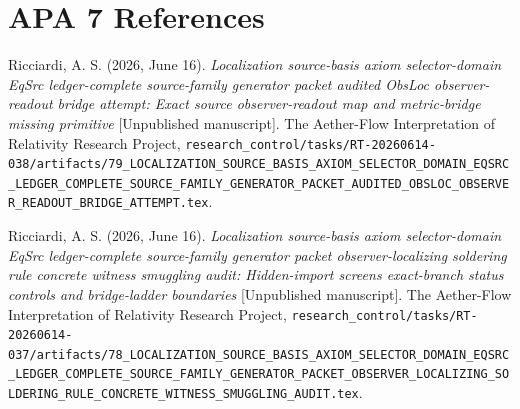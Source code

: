 \documentclass[11pt]{article}
\begin{document}
\section*{APA 7 References}

Ricciardi, A. S. (2026, June 16). \emph{Localization source-basis
axiom selector-domain EqSrc ledger-complete source-family generator
packet audited ObsLoc observer-readout bridge attempt: Exact source
observer-readout map and metric-bridge missing primitive}
[Unpublished manuscript]. The Aether-Flow Interpretation of
Relativity Research Project,
\texttt{research\_control/tasks/RT-20260614-038/artifacts/79\_LOCALIZATION\_SOURCE\_BASIS\_AXIOM\_SELECTOR\_DOMAIN\_EQSRC\_LEDGER\_COMPLETE\_SOURCE\_FAMILY\_GENERATOR\_PACKET\_AUDITED\_OBSLOC\_OBSERVER\_READOUT\_BRIDGE\_ATTEMPT.tex}.

Ricciardi, A. S. (2026, June 16). \emph{Localization source-basis
axiom selector-domain EqSrc ledger-complete source-family generator
packet observer-localizing soldering rule concrete witness smuggling
audit: Hidden-import screens exact-branch status controls and
bridge-ladder boundaries} [Unpublished manuscript]. The Aether-Flow
Interpretation of Relativity Research Project,
\texttt{research\_control/tasks/RT-20260614-037/artifacts/78\_LOCALIZATION\_SOURCE\_BASIS\_AXIOM\_SELECTOR\_DOMAIN\_EQSRC\_LEDGER\_COMPLETE\_SOURCE\_FAMILY\_GENERATOR\_PACKET\_OBSERVER\_LOCALIZING\_SOLDERING\_RULE\_CONCRETE\_WITNESS\_SMUGGLING\_AUDIT.tex}.
\end{document}
